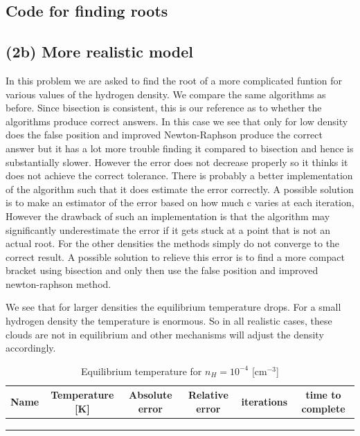 \documentclass{article}
\newcommand{\CodeDir}{Code}
\newcommand{\CalcDir}{Calculations}
\begin{document}
\subsection{Code for finding roots}




\subsection{(2b) More realistic model}

In this problem we are asked to find the root of a more complicated funtion for various values of the hydrogen density.
We compare the same algorithms as before. Since bisection is consistent, this is our reference as to whether 
the algorithms produce correct answers. In this case we see that only for low density does the false position and improved Newton-Raphson produce the correct answer
but it has a lot more trouble finding it compared to bisection and hence is substantially slower. 
However the error does not decrease properly so it thinks it does not achieve the correct tolerance.
There is probably a better implementation of the algorithm such that it does estimate the error correctly.
A possible solution is to make an estimator of the error based on how much c varies at each iteration, However
the drawback of such an implementation is that the algorithm may significantly underestimate the error
if it gets stuck at a point that is not an actual root.
For the other densities the methods simply do not converge to the correct result.
A possible solution to relieve this error is to find a more compact bracket using bisection and only then use the 
false position and improved newton-raphson method.

We see that for larger densities the equilibrium temperature drops. 
For a small hydrogen density the temperature is enormous. So in all realistic cases,
these clouds are not in equilibrium and other mechanisms will adjust the density accordingly.

\begin{table}[H]
\centering
\caption{Equilibrium temperature for $n_H = 10^{-4}$ [cm\(^{-3}\)]}
\begin{tabular}{|c|c|c|c|c|c|}
\hline
Name & Temperature [K] & Absolute error & Relative error & iterations & time to complete \\
\hline
 \\
 \\
 \\
\hline
\end{tabular}
\end{table}
\end{document}
